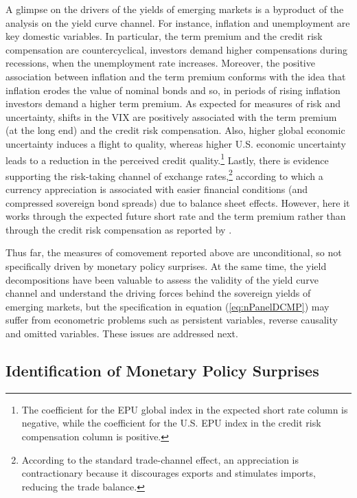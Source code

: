 {A glimpse on the drivers of the yields of emerging markets is a byproduct of the analysis on the yield curve channel. 
For instance, inflation and unemployment are key domestic variables. 
In particular, the term premium and the credit risk compensation are countercyclical, investors demand higher compensations during recessions, when the unemployment rate increases. 
Moreover, the positive association between inflation and the term premium conforms with the idea that inflation erodes the value of nominal bonds and so, in periods of rising inflation investors demand a higher term premium. 
As expected for measures of risk and uncertainty, shifts in the VIX are positively associated with the term premium (at the long end) and the credit risk compensation. %
Also, higher global economic uncertainty induces a flight to quality, whereas higher U.S. economic uncertainty leads to a reduction in the perceived credit quality.\footnote{ The coefficient for the EPU global index in the expected short rate column is negative, while the coefficient for the U.S. EPU index in the credit risk compensation column is positive.}
Lastly, there is evidence supporting the risk-taking channel of exchange rates,\footnote{ According to the standard trade-channel effect, an appreciation is contractionary because it discourages exports and stimulates imports, reducing the trade balance.} 
according to which a currency appreciation is associated with easier financial conditions (and compressed sovereign bond spreads) due to balance sheet effects.
However, here it works through the expected future short rate and the term premium rather than through the credit risk compensation as reported by \cite{HofmannShimShin:2020}.

Thus far, the measures of comovement reported above %
are unconditional, so not specifically driven by monetary policy surprises. At the same time, the yield decompositions have been valuable to assess the validity of the yield curve channel and understand the driving forces behind the sovereign yields of emerging markets, but the specification in equation (\ref{eq:nPanelDCMP}) may suffer from econometric problems such as persistent variables, reverse causality and omitted variables. These issues are addressed next.


\subsection{Identification of Monetary Policy Surprises} \label{sec:USMPS}
\iftoggle{toclinks}{\gototoc}{} %

}
